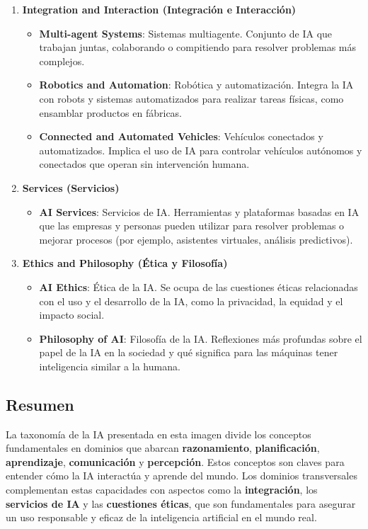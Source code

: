 \begin{enumerate}
\item \textbf{Integration and Interaction (Integración e Interacción)}
  \begin{itemize}
    \item \textbf{Multi-agent Systems}: Sistemas multiagente. Conjunto de IA que trabajan juntas, colaborando o compitiendo para resolver problemas más complejos.
    \item \textbf{Robotics and Automation}: Robótica y automatización. Integra la IA con robots y sistemas automatizados para realizar tareas físicas, como ensamblar productos en fábricas.
    \item \textbf{Connected and Automated Vehicles}: Vehículos conectados y automatizados. Implica el uso de IA para controlar vehículos autónomos y conectados que operan sin intervención humana.
  \end{itemize}

\item \textbf{Services (Servicios)}
  \begin{itemize}
    \item \textbf{AI Services}: Servicios de IA. Herramientas y plataformas basadas en IA que las empresas y personas pueden utilizar para resolver problemas o mejorar procesos (por ejemplo, asistentes virtuales, análisis predictivos).
  \end{itemize}

\item \textbf{Ethics and Philosophy (Ética y Filosofía)}
  \begin{itemize}
    \item \textbf{AI Ethics}: Ética de la IA. Se ocupa de las cuestiones éticas relacionadas con el uso y el desarrollo de la IA, como la privacidad, la equidad y el impacto social.
    \item \textbf{Philosophy of AI}: Filosofía de la IA. Reflexiones más profundas sobre el papel de la IA en la sociedad y qué significa para las máquinas tener inteligencia similar a la humana.
  \end{itemize}
\end{enumerate}

\subsection{Resumen}\label{resumen}

La taxonomía de la IA presentada en esta imagen divide los conceptos fundamentales en dominios que abarcan \textbf{razonamiento}, \textbf{planificación}, \textbf{aprendizaje}, \textbf{comunicación} y \textbf{percepción}. Estos conceptos son claves para entender cómo la IA interactúa y aprende del mundo. Los dominios transversales complementan estas capacidades con aspectos como la \textbf{integración}, los \textbf{servicios de IA} y las \textbf{cuestiones éticas}, que son fundamentales para asegurar un uso responsable y eficaz de la inteligencia artificial en el mundo real.


